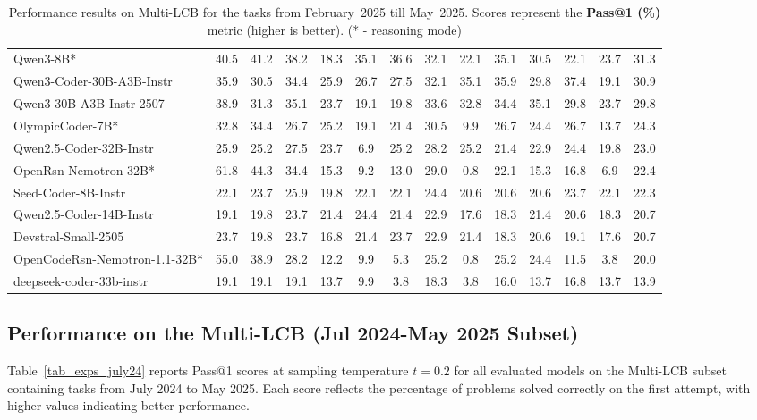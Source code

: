\documentclass{llmxive}
\begin{document}
\begin{table}[hbt]
{\begin{tabular}{l *{13}{c}}
Qwen3-8B*                  & 40.5 & 41.2 & 38.2 & 18.3 & 35.1 & 36.6 & 32.1 & 22.1 & 35.1 & 30.5 & 22.1 & 23.7 & 31.3 \\
Qwen3-Coder-30B-A3B-Instr      & 35.9 & 30.5 & 34.4 & 25.9 & 26.7 & 27.5 & 32.1 & 35.1 & 35.9 & 29.8 & 37.4 & 19.1 & 30.9 \\
Qwen3-30B-A3B-Instr-2507       & 38.9 & 31.3 & 35.1 & 23.7 & 19.1 & 19.8 & 33.6 & 32.8 & 34.4 & 35.1 & 29.8 & 23.7 & 29.8 \\
OlympicCoder-7B*           & 32.8 & 34.4 & 26.7 & 25.2 & 19.1 & 21.4 & 30.5 & 9.9  & 26.7 & 24.4 & 26.7 & 13.7 & 24.3 \\
Qwen2.5-Coder-32B-Instr        & 25.9 & 25.2 & 27.5 & 23.7 & 6.9  & 25.2 & 28.2 & 25.2 & 21.4 & 22.9 & 24.4 & 19.8 & 23.0 \\
OpenRsn-Nemotron-32B*      & 61.8 & 44.3 & 34.4 & 15.3 & 9.2  & 13.0 & 29.0 & 0.8  & 22.1 & 15.3 & 16.8 & 6.9  & 22.4 \\
Seed-Coder-8B-Instr            & 22.1 & 23.7 & 25.9 & 19.8 & 22.1 & 22.1 & 24.4 & 20.6 & 20.6 & 20.6 & 23.7 & 22.1 & 22.3 \\
Qwen2.5-Coder-14B-Instr        & 19.1 & 19.8 & 23.7 & 21.4 & 24.4 & 21.4 & 22.9 & 17.6 & 18.3 & 21.4 & 20.6 & 18.3 & 20.7 \\
Devstral-Small-2505            & 23.7 & 19.8 & 23.7 & 16.8 & 21.4 & 23.7 & 22.9 & 21.4 & 18.3 & 20.6 & 19.1 & 17.6 & 20.7 \\
OpenCodeRsn-Nemotron-1.1-32B* & 55.0 & 38.9 & 28.2 & 12.2 & 9.9  & 5.3  & 25.2 & 0.8  & 25.2 & 24.4 & 11.5 & 3.8  & 20.0 \\
deepseek-coder-33b-instr       & 19.1 & 19.1 & 19.1 & 13.7 & 9.9  & 3.8  & 18.3 & 3.8  & 16.0 & 13.7 & 16.8 & 13.7 & 13.9 \\
\bottomrule
\end{tabular}%
}
\caption{Performance results on Multi-LCB for the tasks from February~2025 till May~2025.
Scores represent the \textbf{Pass@1 (\%)} metric (higher is better). (* - reasoning mode)}
\label{tab_exps_feb25_pass1_t0.2}
\end{table}

\fi


\subsection{Performance on the Multi-LCB (Jul 2024-May 2025 Subset)}

Table~\ref{tab_exps_july24} reports Pass@1 scores at sampling temperature $t = 0.2$ for all evaluated models on the Multi-LCB subset containing tasks from July 2024 to May 2025. Each score reflects the percentage of problems solved correctly on the first attempt, with higher values indicating better performance.
 
\end{document}
